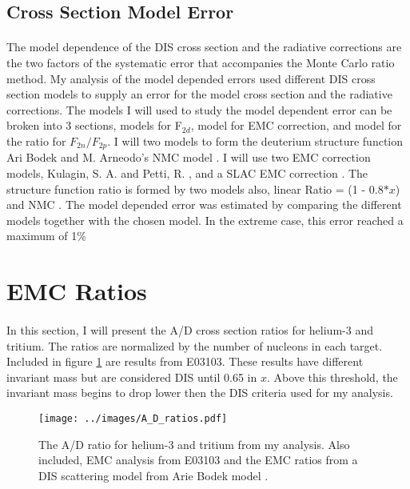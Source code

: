 \subsection{Cross Section Model Error}
\paragraph{}
The model dependence of the DIS cross section and the radiative corrections are the two factors of the systematic error that accompanies the Monte Carlo ratio method. My analysis of the model depended errors used different DIS cross section models to supply an error for the model cross section and the radiative corrections. The models I will used to study the model dependent error can be broken into 3 sections, models for F$_{2d}$, model for EMC correction, and model for the ratio for $F_{2n}/F_{2p}$. I will two models to form the deuterium structure function Ari Bodek \cite{DISmodel} and M. Arneodo's NMC model \cite{NMC_model}. I will use two EMC correction models, Kulagin, S. A. and Petti, R. \cite{kpmodel}, and a SLAC EMC correction \cite{SLAC_bodek}. The structure function ratio is formed by two models also, linear Ratio = (1 - 0.8$*x$) and NMC \cite{NMC_ratio}. The model depended error was estimated by comparing the different models together with the chosen model. In the extreme case, this error reached a maximum of 1\%    

\section{EMC Ratios}
\paragraph{}In this section, I will present the A/D cross section ratios for helium-3 and tritium. The ratios are normalized by the number of nucleons in each target. Included in figure \ref{ADplot} are results from E03103. These results have different invariant mass but are considered DIS until 0.65 in $x$. Above this threshold, the invariant mass begins to drop lower then the DIS criteria used for my analysis. 
\begin{figure}
	\centering
	\texttt{[image: ../images/A\_D\_ratios.pdf]}
	\caption{The A/D ratio for helium-3 and tritium from my analysis. Also included, EMC analysis from E03103\cite{seeley} and the EMC ratios from a DIS scattering model from Arie Bodek model \cite{DISmodel}.}
	\label{ADplot}
\end{figure}

